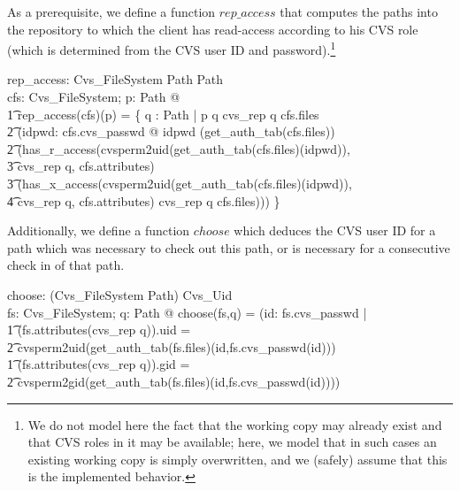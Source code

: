 As a prerequisite, we define a function $rep\_access$ that computes the paths
into the repository to which the client has read-access according to his CVS
role (which is determined from the CVS user ID and password).\footnote{We do not
  model here the fact that the working copy may already exist and that CVS roles
  in it may be available; here, we model that in such cases an existing working
  copy is simply overwritten, and we (safely) assume that this is the
  implemented behavior.}
\begin{axdef}
  rep\_access: Cvs\_FileSystem \fun Path \fun \power Path \\
  \where
  \forall cfs: Cvs\_FileSystem; p: Path @ \\
  \t1 rep\_access(cfs)(p) = \{ q : Path | p \prefix q \land cvs\_rep \cat q \in
  \dom cfs.files \\
  \t2 \land (\exists idpwd: cfs.cvs\_passwd @ idpwd \in
  \dom (get\_auth\_tab(cfs.files)) \\ 
  \t2 \land (has\_r\_access(cvsperm2uid(get\_auth\_tab(cfs.files)(idpwd)), \\
  \t3 cvs\_rep \cat q, cfs.attributes) \\
  \t3 \lor (has\_x\_access(cvsperm2uid(get\_auth\_tab(cfs.files)(idpwd)), \\
  \t4 cvs\_rep \cat q, cfs.attributes) \land cvs\_rep \cat q \isdirin
  cfs.files))) \} \\ 
\end{axdef}

Additionally, we define a function $choose$ which deduces the CVS user ID for a
path which was necessary to check out this path, or is necessary for a
consecutive check in of that path.
\begin{axdef}
  choose: (Cvs\_FileSystem \cross Path) \fun Cvs\_Uid \\
  \where \forall fs: Cvs\_FileSystem; q: Path @ choose(fs,q) = (\mu id: \dom
  fs.cvs\_passwd | \\
  \t1 (fs.attributes(cvs\_rep \cat q)).uid = \\
  \t2 cvsperm2uid(get\_auth\_tab(fs.files)(id,fs.cvs\_passwd(id))) \\
  \t1 \land (fs.attributes(cvs\_rep \cat q)).gid = \\
  \t2 cvsperm2gid(get\_auth\_tab(fs.files)(id,fs.cvs\_passwd(id)))) \\
\end{axdef}

